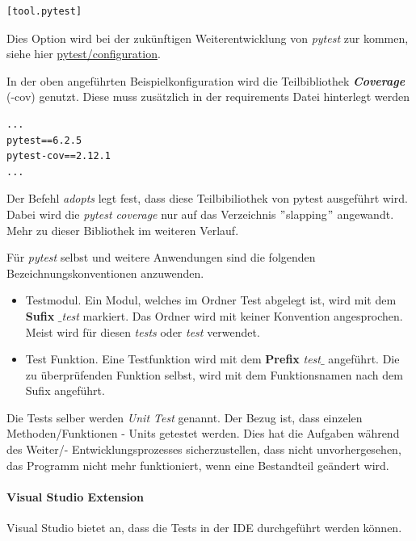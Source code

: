 \begin{lstlisting}[style=Config, caption={nicht zu verwenden}, captionpos=b]
[tool.pytest]
\end{lstlisting}

Dies Option wird bei der zukünftigen Weiterentwicklung von \textit{pytest} zur kommen, siehe hier \href{https://docs.pytest.org/en/6.2.x/customize.htmlpyproject-toml}{pytest/configuration}.

In der oben angeführten Beispielkonfiguration wird die Teilbibliothek \textbf{\textit{Coverage}} (-cov) genutzt. Diese muss zusätzlich in der requirements Datei hinterlegt werden

\begin{lstlisting}[style=Config, caption={Bsp. requirements\_dev.txt; pytest und pytest-cov}, captionpos=b]
...
pytest==6.2.5
pytest-cov==2.12.1
...
\end{lstlisting}

Der Befehl \textit{adopts} legt fest, dass diese Teilbibiliothek von pytest ausgeführt wird. Dabei wird die \textit{pytest coverage} nur auf das Verzeichnis $"$slapping$"$ angewandt. Mehr zu dieser Bibliothek im weiteren Verlauf.

Für \textit{pytest} selbst und weitere Anwendungen sind die folgenden Bezeichnungskonventionen anzuwenden.
\begin{itemize}
	\item Testmodul. Ein Modul, welches im Ordner Test abgelegt ist, wird mit dem \textbf{Sufix} $\_$\textit{test} markiert. Das Ordner wird mit keiner Konvention angesprochen. Meist wird für diesen \textit{tests} oder \textit{test} verwendet.
	\item Test Funktion. Eine Testfunktion wird mit dem \textbf{Prefix} \textit{test}$\_$ angeführt. Die zu überprüfenden Funktion selbst, wird mit dem Funktionsnamen nach dem Sufix angeführt.
\end{itemize}


Die Tests selber werden \textit{Unit Test} genannt. Der Bezug ist, dass einzelen Methoden/Funktionen - Units getestet werden. Dies hat die Aufgaben während des Weiter/- Entwicklungsprozesses sicherzustellen, dass nicht unvorhergesehen, das Programm nicht mehr funktioniert, wenn eine Bestandteil geändert wird.

\paragraph{Visual Studio Extension}
Visual Studio bietet an, dass die Tests in der \gls{IDE} durchgeführt werden können.

